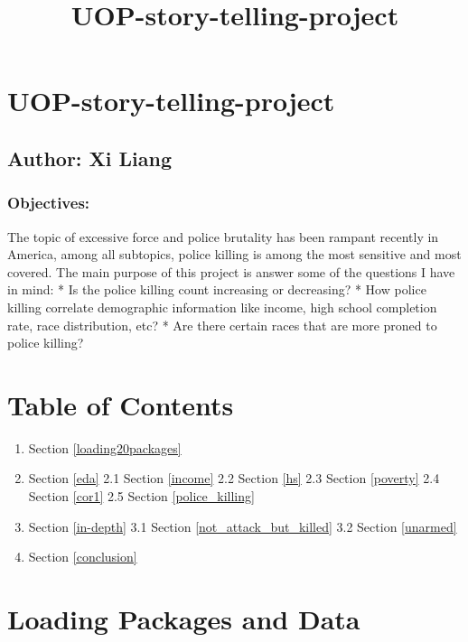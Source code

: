 \documentclass[11pt]{article}
\title{UOP-story-telling-project}
\providecommand{\tightlist}{%
      \setlength{\itemsep}{0pt}\setlength{\parskip}{0pt}}
\begin{document}
    
    
    \maketitle
    
    

    
    \section{UOP-story-telling-project}\label{uop-story-telling-project}

\subsection{Author: Xi Liang}\label{author-xi-liang}

\subsubsection{Objectives:}\label{objectives}

The topic of excessive force and police brutality has been rampant
recently in America, among all subtopics, police killing is among the
most sensitive and most covered. The main purpose of this project is
answer some of the questions I have in mind: * Is the police killing
count increasing or decreasing? * How police killing correlate
demographic information like income, high school completion rate, race
distribution, etc? * Are there certain races that are more proned to
police killing?

    \section{Table of Contents}\label{table-of-contents}

\begin{enumerate}
\def\labelenumi{\arabic{enumi}.}
\tightlist
\item
  Section \ref{loading20packages}
\item
  Section \ref{eda} 2.1 Section \ref{income} 2.2 Section \ref{hs} 2.3
  Section \ref{poverty} 2.4 Section \ref{cor1} 2.5
  Section \ref{police_killing} 
\item
  Section \ref{in-depth} 3.1 Section \ref{not_attack_but_killed} 3.2
  Section \ref{unarmed} 
\item
  Section \ref{conclusion} 
\end{enumerate}

    \section{Loading Packages and Data}\label{loading-packages-and-data}
\end{document}
